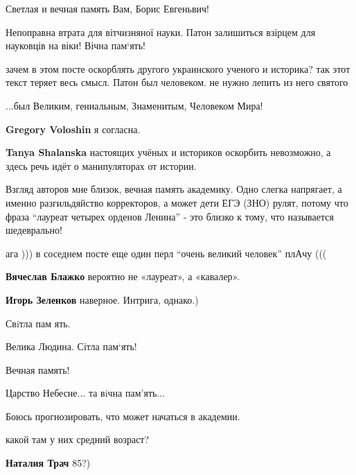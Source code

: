 \begin{itemize}
Светлая и вечная память Вам, Борис Евгеньвич!


Непоправна втрата для вітчизняної науки. Патон залишиться взірцем для науковців на віки! Вічна пам‘ять!


зачем в этом посте оскорблять другого украинского ученого и историка? так этот
текст теряет весь смысл. Патон был человеком. не нужно лепить из него святого

\begin{itemize} %
...был Великим, гениальным, Знаменитым, Человеком Мира!

\textbf{Gregory Voloshin} я согласна.

\textbf{Tanya Shalanska} настоящих учёных и историков оскорбить невозможно, а здесь речь идёт о манипуляторах от истории.
\end{itemize} %


Взгляд авторов мне близок, вечная память академику. Одно слегка напрягает, а
именно разгильдяйство корректоров, а может дети ЕГЭ (ЗНО) рулят, потому что
фраза \enquote{лауреат четырех орденов Ленина} - это близко к тому, что называется
шедеврально!

\begin{itemize} %
ага )))
в соседнем посте еще один перл \enquote{очень великий человек}
плАчу (((

\textbf{Вячеслав Блажко} вероятно не «лауреат», а «кавалер».

\textbf{Игорь Зеленков} наверное. Интрига, однако.)
\end{itemize} %

Свiтла пам ять.

Велика Людина. Сітла пам‘ять!

Вечная память!

Царство Небесне... та вiчна пам’ять...

Боюсь прогнозировать, что может начаться в академии.

\begin{itemize} %
какой там у них средний возраст?

\begin{itemize} %
\textbf{Наталия Трач} 85?)


\end{itemize}
\end{itemize}
\end{itemize}
